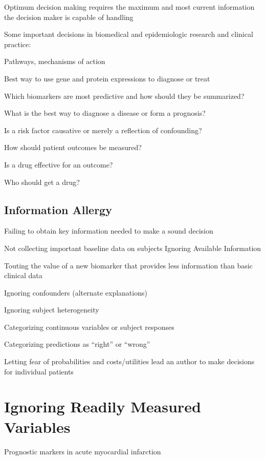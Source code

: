 Optimum decision making requires the maximum and most current
information the decision maker is capable of handling

Some important decisions in biomedical and epidemiologic research
  and clinical practice:
\bi
\item Pathways, mechanisms of action
\item Best way to use gene and protein expressions to diagnose or
  treat
\item Which biomarkers are most predictive and how should they be
  summarized?
\item What is the best way to diagnose a disease or form a prognosis?
\item Is a risk factor causative or merely a reflection of
  confounding?
\item How should patient outcomes be measured?
\item Is a drug effective for an outcome?
\item Who should get a drug?
\ei

\subsection{Information Allergy}
Failing to obtain key information needed to make a sound decision
 \bi
 \item Not collecting important baseline data on subjects
 \ei
Ignoring Available Information
\bi
\item Touting the value of a new biomarker that provides less
  information than basic clinical data
\item Ignoring confounders (alternate explanations)
\item Ignoring subject heterogeneity
\item Categorizing continuous variables or subject responses
\item Categorizing predictions as ``right'' or ``wrong''
\item Letting fear of probabilities and costs/utilities lead an author to make
decisions for individual patients
\ei

\section{Ignoring Readily Measured Variables}

Prognostic markers in acute myocardial infarction

